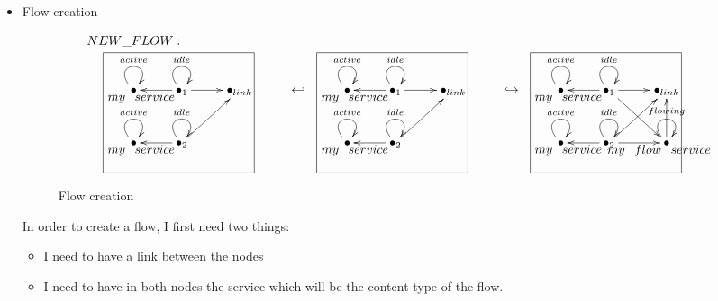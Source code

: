 \documentclass[envcountsect,runningheads]{llncs}
\begin{document}
  \begin{itemize}
    \item Flow creation
  \begin{figure}[H]
    \[
       \xymatrix@C=25pt@R=30pt
       {
         {}\POS[]-<0pc,0pc>\drop{NEW\_FLOW:}
         \\
         {\bullet}\ar@(ul,ur)^{active} \POS[]-<-.5pc,.5pc> \drop{my\_service} &
         {\bullet}_{1}\ar@(ul,ur)^{idle}\ar@{->}[l]\ar@{->}[r] &
         {\bullet}_{link}
         & {\hookleftarrow} & 
         {\bullet}\ar@(ul,ur)^{active} \POS[]-<-.5pc,.5pc> \drop{my\_service} &
         {\bullet}_{1}\ar@(ul,ur)^{idle}\ar@{->}[l]\ar@{->}[r] &
         {\bullet}_{link} 
         & {\hookrightarrow} & 
         {\bullet}\ar@(ul,ur)^{active} \POS[]-<-.5pc,.5pc> \drop{my\_service} &
         {\bullet}_{1}\ar@(ul,ur)^{idle}\ar@{->}[l]\ar@{->}[r]\ar@{->}[dr] &
         {\bullet}_{link}
         \\
         {\bullet}\ar@(ul,ur)^{active}\POS[]-<-.5pc,.5pc> \drop{my\_service} \POS[]+<3pc,2pc>*+=<10pc,8pc>[F-]{} &
         {\bullet}_{2}\ar@(ul,ur)^{idle}\ar@{->}[l]\ar@{->}[ur]
         & & &
         {\bullet}\ar@(ul,ur)^{active}\POS[]-<-.5pc,.5pc> \drop{my\_service} \POS[]+<3pc,2pc>*+=<10pc,8pc>[F-]{} &
         {\bullet}_{2}\ar@(ul,ur)^{idle}\ar@{->}[l]\ar@{->}[ur]
         & & &
        {\bullet}\ar@(ul,ur)^{active}\POS[]-<-.5pc,.5pc> \drop{my\_service} \POS[]+<3pc,2pc>*+=<10pc,8pc>[F-]{} &
         {\bullet}_{2}\ar@(ul,ur)^{idle}\ar@{->}[l]\ar@{->}[ur]\ar@{->}[r] &
         {\bullet}\ar@(ul,ur)^{flowing}\ar@{->}[u] \POS[]-<.5pc,.5pc> \drop{my\_flow\_service}
      }
    \]
    \caption{Flow creation}
    \protect\label{fig:flowcreation}
  \end{figure}
  In order to create a flow, I first need two things: 
  \begin{itemize}
    \item I need to have a link between the nodes
    \item I need to have in both nodes the service which will be the content type of the flow.  
   \end{itemize}
  

\end{itemize}
\end{document}
